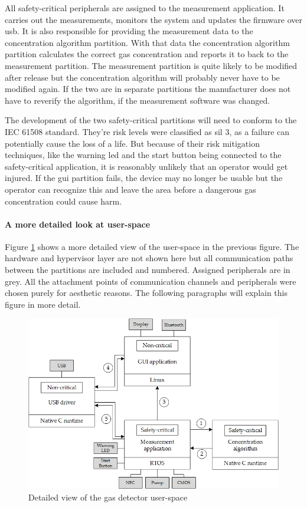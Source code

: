 All safety-critical peripherals are assigned to the measurement application. It carries out the measurements, monitors the system and updates the firmware over \acrshort{usb}. It is also responsible for providing the measurement data to the concentration algorithm partition. With that data the concentration algorithm partition calculates the correct gas concentration and reports it to back to the measurement partition.  The measurement partition is quite likely to be modified after release but the concentration algorithm will probably never have to be modified again. If the two are in separate partitions the manufacturer does not have to reverify the algorithm, if the measurement software was changed.

The development of the two safety-critical partitions will need to conform to the IEC 61508 standard. They're risk levels were classified as \acrshort{sil} 3, as a failure can potentially cause the loss of a life. But because of their risk mitigation techniques, like the warning \acrshort{led} and the start button being connected to the safety-critical application, it is reasonably unlikely that an operator would get injured. If the \acrshort{gui} partition fails, the device may no longer be usable but the operator can recognize this and leave the area before a dangerous gas concentration could cause harm.

\paragraph{A more detailed look at user-space}
Figure \ref{fig:gas_detect_low_leve} shows a more detailed view of the user-space in the previous figure. The hardware and hypervisor layer are not shown here but all communication paths between the partitions are included and numbered. Assigned peripherals are in grey. All the attachment points of communication channels and peripherals were chosen purely for aesthetic reasons. The following paragraphs will explain this figure in more detail.

\begin{figure}[ht!]
\centering
\includegraphics[scale=0.75]{Figures/gas_detect_low_level.png}
\decoRule
\caption{Detailed view of the gas detector user-space}
\label{fig:gas_detect_low_leve}
\end{figure}
